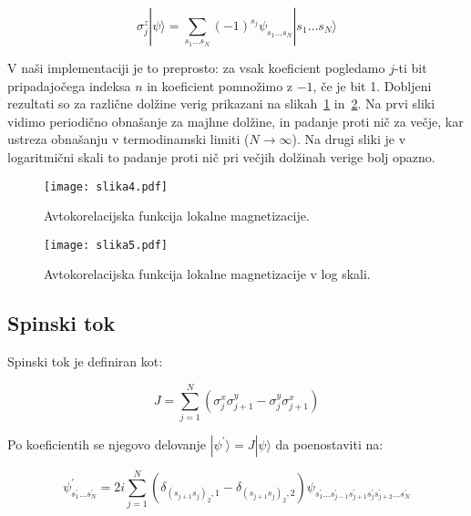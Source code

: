 \documentclass[a4paper]{article}
\newcommand{\ket}[1]{|#1\rangle}
\begin{document}
    \begin{equation}\label{eq18}
        \sigma_j^z \ket{\psi} = \sum_{s_1\ldots s_N} (-1)^{s_j} \psi_{s_1\ldots s_N}\ket{s_1\ldots s_N}
    \end{equation}

    V naši implementaciji je to preprosto: za vsak koeficient pogledamo $j$-ti bit pripadajočega indeksa $n$ in
    koeficient pomnožimo z $-1$, če je bit 1.
    Dobljeni rezultati so za različne dolžine verig prikazani na slikah~\ref{slika4} in~\ref{slika5}.
    Na prvi sliki vidimo periodično obnašanje za majhne dolžine, in padanje proti nič za večje, kar ustreza
    obnašanju v termodinamski limiti ($N \to \infty$).
    Na drugi sliki je v logaritmični skali to padanje proti nič pri večjih dolžinah verige bolj opazno.

    \begin{figure}
        \centering
        \texttt{[image: slika4.pdf]}
        \caption{Avtokorelacijska funkcija lokalne magnetizacije.}
        \label{slika4}
    \end{figure}

    \begin{figure}
        \centering
        \texttt{[image: slika5.pdf]}
        \caption{Avtokorelacijska funkcija lokalne magnetizacije v log skali.}
        \label{slika5}
    \end{figure}

    \subsection{Spinski tok}

    Spinski tok je definiran kot:

    \begin{equation}\label{eq19}
        J = \sum_{j=1}^N \left( \sigma_j^x\sigma_{j+1}^y - \sigma_j^y\sigma_{j+1}^x \right)
    \end{equation}

    Po koeficientih se njegovo delovanje $\ket{\psi^\prime} = J \ket{\psi}$ da poenostaviti na:

    \begin{equation}\label{eq20}
        \psi^\prime_{s_1^\prime\ldots s_N^\prime} = 2i \sum_{j=1}^N
        (\delta_{(s_{j+1}s_j)_2, 1} - \delta_{(s_{j+1}s_j)_2, 2})
        \psi_{s_1^\prime \ldots s_{j-1}^\prime s_{j+1}^\prime s_j^\prime s_{j+2}^\prime \ldots s_N^\prime}
    \end{equation}
\end{document}
